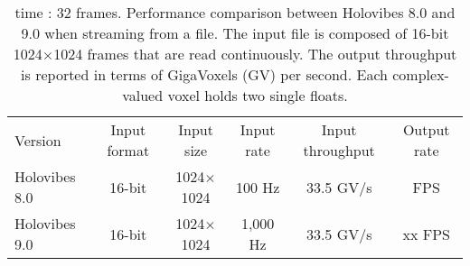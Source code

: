 \renewcommand{\arraystretch}{1.25}
\begin{table*}[t]
    \begin{ruledtabular}
        \begin{tabular}{lccccc}
            \textrm{Version}&
            \textrm{Input format}&
            \textrm{Input size}&
            \textrm{Input rate}&
            \textrm{Input throughput}& 
            \textrm{Output rate}\\
            \colrule
            Holovibes 8.0 & 16-bit & 1024$\times$1024 & 100 Hz &  33.5 GV/s & FPS \\
            \colrule
            Holovibes 9.0 & 16-bit & 1024$\times$1024 & 1,000 Hz & 33.5 GV/s & xx FPS \\
        \end{tabular}
    \end{ruledtabular}
    \caption{\label{tab:results_2} time : 32 frames. Performance comparison between Holovibes 8.0 and 9.0 when streaming from a file. The input file is composed of 16-bit 1024$\times$1024 frames that are read continuously. The output throughput is reported in terms of GigaVoxels (GV) per second. Each complex-valued voxel holds two single floats.
    }
\end{table*}